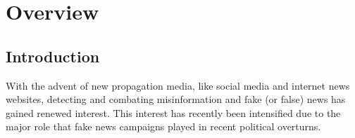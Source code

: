 \documentclass{report}
\theoremstyle{definition}
\begin{document}






\chapter{Overview}
\section{Introduction}
With the advent of new propagation media, like social media and internet news websites, detecting and combating misinformation and fake (or false) news has gained renewed interest. This interest has recently been intensified due to the major role that fake news campaigns played in recent political overturns.
\end{document}

